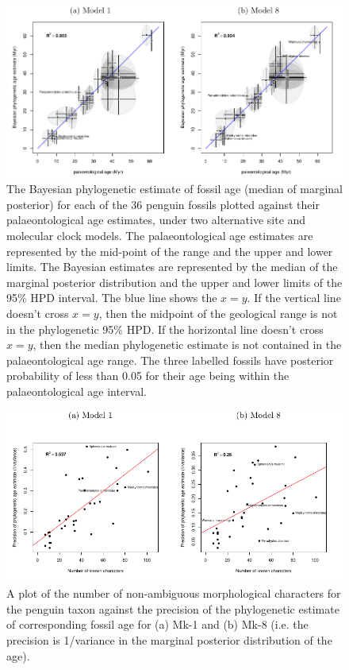 \documentclass[11pt]{article}
\newcommand{\Mstrict}{{Mk-1}}
\newcommand{\Mrelaxed}{{Mk-8}}
\begin{document}
\begin{figure}
\includegraphics{Figure1.pdf}
\caption{\label{fig:phyloAgeVsGeoAge}
The Bayesian phylogenetic estimate of fossil age (median of marginal posterior) for each of the 36 penguin fossils plotted against their palaeontological age estimates, under two alternative site and molecular clock models. 
The palaeontological age estimates are represented by the mid-point of the range and the upper and lower limits. 
The Bayesian estimates are represented by the median of the marginal posterior distribution and the upper and lower limits of the 95\% HPD interval. 
The blue line shows the $x=y$. If the vertical line doesn't cross $x=y$, then the midpoint of the geological range is not in the phylogenetic 95\% HPD. 
If the horizontal line doesn't cross $x=y$, then the median phylogenetic estimate is not contained in the palaeontological age range. 
The three labelled fossils have posterior probability of less than 0.05 for their age being within the palaeontological age interval.
}
\end{figure}

\begin{figure}
\includegraphics[width=5in]{Figure2.pdf}
\caption{\label{fig:precisionVsnumberCharacters} A plot of the number of non-ambiguous morphological characters for the penguin taxon against the precision of the phylogenetic estimate of corresponding fossil age for (a) \Mstrict{} and (b) \Mrelaxed{} (i.e. the precision is 1/variance in the marginal posterior distribution of the age).}
\end{figure}
\end{document}
